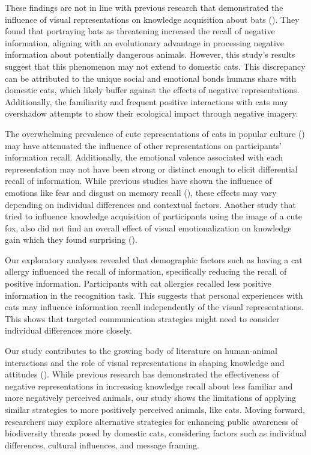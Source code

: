 \documentclass[
  man,
  longtable,
  nolmodern,
  notxfonts,
  notimes,
  colorlinks=true,linkcolor=blue,citecolor=blue,urlcolor=blue]{apa7}
\begin{document}
These findings are not in line with previous research that demonstrated
the influence of visual representations on knowledge acquisition about
bats (). They found that
portraying bats as threatening increased the recall of negative
information, aligning with an evolutionary advantage in processing
negative information about potentially dangerous animals. However, this
study's results suggest that this phenomenon may not extend to domestic
cats. This discrepancy can be attributed to the unique social and
emotional bonds humans share with domestic cats, which likely buffer
against the effects of negative representations. Additionally, the
familiarity and frequent positive interactions with cats may overshadow
attempts to show their ecological impact through negative imagery.

The overwhelming prevalence of cute representations of cats in popular
culture () may
have attenuated the influence of other representations on participants'
information recall. Additionally, the emotional valence associated with
each representation may not have been strong or distinct enough to
elicit differential recall of information. While previous studies have
shown the influence of emotions like fear and disgust on memory recall
(), these
effects may vary depending on individual differences and contextual
factors. Another study that tried to influence knowledge acquisition of
participants using the image of a cute fox, also did not find an overall
effect of visual emotionalization on knowledge gain which they found
surprising ().

Our exploratory analyses revealed that demographic factors such as
having a cat allergy influenced the recall of information, specifically
reducing the recall of positive information. Participants with cat
allergies recalled less positive information in the recognition task.
This suggests that personal experiences with cats may influence
information recall independently of the visual representations. This
shows that targeted communication strategies might need to consider
individual differences more closely.

Our study contributes to the growing body of literature on human-animal
interactions and the role of visual representations in shaping knowledge
and attitudes ().
While previous research has demonstrated the effectiveness of negative
representations in increasing knowledge recall about less familiar and
more negatively perceived animals, our study shows the limitations of
applying similar strategies to more positively perceived animals, like
cats. Moving forward, researchers may explore alternative strategies for
enhancing public awareness of biodiversity threats posed by domestic
cats, considering factors such as individual differences, cultural
influences, and message framing.
\end{document}
